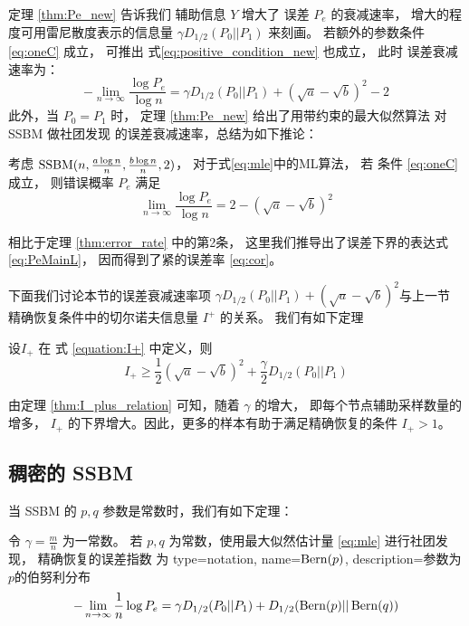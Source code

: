 定理 \ref{thm:Pe_new} 告诉我们
辅助信息  $Y$  增大了 误差 $P_e$ 的衰减速率，
增大的程度可用雷尼散度表示的信息量
$\gamma D_{1/2}(P_0||P_1)$ 
来刻画。
若额外的参数条件 \eqref{eq:oneC} 成立，
可推出 式\eqref{eq:positive_condition_new} 也成立，
此时
误差衰减速率为：
$$
-\lim_{n\to \infty} \frac{\log P_e}{\log n}
= \gamma D_{1/2}(P_0||P_1) + \left(\sqrt{a} - \sqrt{b}\right)^2-2
$$
此外，当 $P_0=P_1$ 时，
定理 \ref{thm:Pe_new} 给出了用带约束的最大似然算法
对SSBM 做社团发现
的误差衰减速率，总结为如下推论：
\begin{corollary}\label{cor:sbm}
考虑
$\operatorname{SSBM}(n,\frac{a\log n}{n}, \frac{b \log n}{n}, 2)$，
对于式\eqref{eq:mle}中的ML算法， 
若 条件 \eqref{eq:oneC} 成立，
则错误概率 $P_e$ 满足
\begin{equation}\label{eq:cor}
\lim_{n\to \infty} \frac{\log P_e}{\log n} =2-\left(\sqrt{a} - \sqrt{b}\right)^2
\end{equation}

\end{corollary}
相比于定理 \ref{thm:error_rate} 中的第2条，
这里我们推导出了误差下界的表达式 \eqref{eq:PeMainL}，
因而得到了紧的误差率 \eqref{eq:cor}。

下面我们讨论本节的误差衰减速率项
$\gamma D_{1/2}(P_0||P_1) +
\left(\sqrt{a} - \sqrt{b}\right)^2$与上一节
精确恢复条件中的切尔诺夫信息量 $I^+$ 的关系。
我们有如下定理
\begin{theorem}\label{thm:I_plus_relation}
    设$I_+$ 在 式 \eqref{equation:I+}
    中定义，则
    \begin{equation}
        I_+ \geq \frac{1}{2}
        \left(\sqrt{a} - \sqrt{b}\right)^2 +
        \frac{\gamma}{2} D_{1/2}(P_0||P_1)
    \end{equation}
\end{theorem}
	由定理 \ref{thm:I_plus_relation} 
    可知，随着  $\gamma$ 的增大， 即每个节点辅助采样数量的增多， $I_+$
    的下界增大。因此，更多的样本有助于满足精确恢复的条件 $I_+>1$。 

\subsection{稠密的 SSBM}
当 SSBM 的 $p,q$ 参数是常数时，我们有如下定理：
\begin{theorem}\label{thm:constant}
	令 $\gamma = \frac{m}{n}$ 为一常数。
    若 $p,q$ 为常数，使用最大似然估计量 \eqref{eq:mle}
    进行社团发现，
	精确恢复的误差指数
    为
{
  type=notation,
  name={$\operatorname{Bern}(p)$},
  description={参数为$p$的伯努利分布}
}
	\begin{equation}\label{eq:dense_error_exponent}
	-\lim_{n\to \infty} \frac{1}{n}\log P_e = 
     \gamma D_{1/2}(P_0 || P_1) + D_{1/2}(\operatorname{Bern}(p)||\operatorname{Bern}(q))
	\end{equation} 
\end{theorem}

